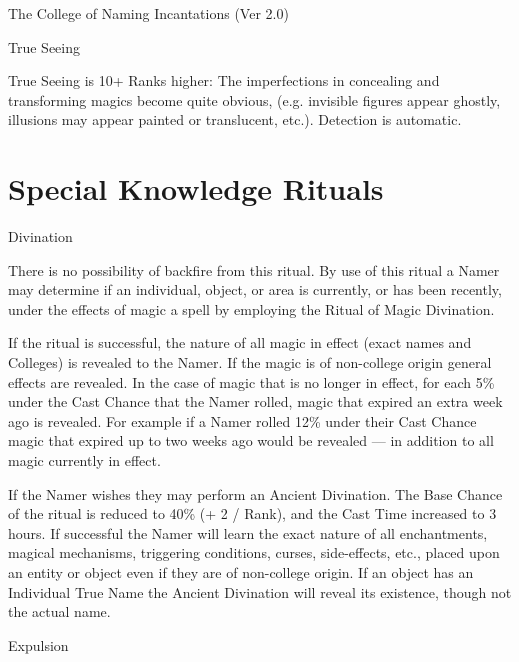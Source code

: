 \begin{Chapter}{The College of Naming Incantations (Ver 2.0)}
\begin{spell}[S-10]{True Seeing}
\begin{effects}
True Seeing is 10+ Ranks higher: The imperfections in concealing and
transforming magics become quite obvious, (e.g.  invisible figures
appear ghostly, illusions may appear painted or translucent,
etc.). Detection is automatic.
\end{effects}
\end{spell}

\section{Special Knowledge Rituals}

\begin{ritual}[R-1]{Divination}

\begin{effects}
There is no possibility of backfire from this ritual.  By use of this
ritual a Namer may determine if an individual, object, or area is
currently, or has been recently, under the effects of magic a spell by
employing the Ritual of Magic Divination.

If the ritual is successful, the nature of all magic in effect (exact
names and Colleges) is revealed to the Namer.  If the magic is of
non-college origin general effects are revealed.  In the case of magic
that is no longer in effect, for each 5\% under the Cast Chance that
the Namer rolled, magic that expired an extra week ago is revealed.
For example if a Namer rolled 12\% under their Cast Chance magic that
expired up to two weeks ago would be revealed — in addition to all
magic currently in effect.

If the Namer wishes they may perform an Ancient Divination.  The Base
Chance of the ritual is reduced to 40\% (+ 2 / Rank), and the Cast
Time increased to 3 hours.  If successful the Namer will learn the
exact nature of all enchantments, magical mechanisms, triggering
conditions, curses, side-effects, etc., placed upon an entity or
object even if they are of non-college origin.  If an object has an
Individual True Name the Ancient Divination will reveal its existence,
though not the actual name.
\end{effects}
\end{ritual}

\begin{ritual}[R-2]{Expulsion}


\end{ritual}
\end{Chapter}
